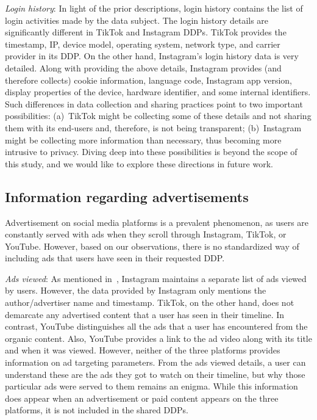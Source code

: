 \noindent
\textit{Login history}: In light of the prior descriptions, login history contains the list of login activities made by the data subject.
The login history details are significantly different in TikTok and Instagram DDPs.
TikTok provides the timestamp, IP, device model, operating system, network type, and carrier provider in its DDP. 
On the other hand, Instagram's login history data is very detailed. 
Along with providing the above details, Instagram provides (and therefore collects) cookie information, language code, Instagram app version, display properties of the device, hardware identifier, and some internal identifiers.
%
Such differences in data collection and sharing practices point to two important possibilities: (a)~TikTok might be collecting some of these details and not sharing them with its end-users and, therefore, is not being transparent; (b)~Instagram might be collecting more information than necessary, thus becoming more intrusive to privacy.
Diving deep into these possibilities is beyond the scope of this study, and we would like to explore these directions in future work.




\subsection{Information regarding advertisements}\label{Sec: Ads}
Advertisement on social media platforms is a prevalent phenomenon, as users are constantly served with ads when they scroll through Instagram, TikTok, or YouTube.
However, based on our observations, there is no standardized way of including ads that users have seen in their requested DDP. 

\noindent
\textit{Ads viewed}: As mentioned in~, Instagram maintains a separate list of ads viewed by users. 
However, the data provided by Instagram only mentions the author/advertiser name and timestamp.
TikTok, on the other hand, does not demarcate any advertised content that a user has seen in their timeline. 
In contrast, YouTube distinguishes all the ads that a user has encountered from the organic content. 
Also, YouTube provides a link to the ad video along with its title and when it was viewed.
However, neither of the three platforms provides information on ad targeting parameters.
From the ads viewed details, a user can understand these are the ads they got to watch on their timeline, but why those particular ads were served to them remains an enigma.
While this information does appear when an advertisement or paid content appears on the three platforms, it is not included in the shared DDPs.


